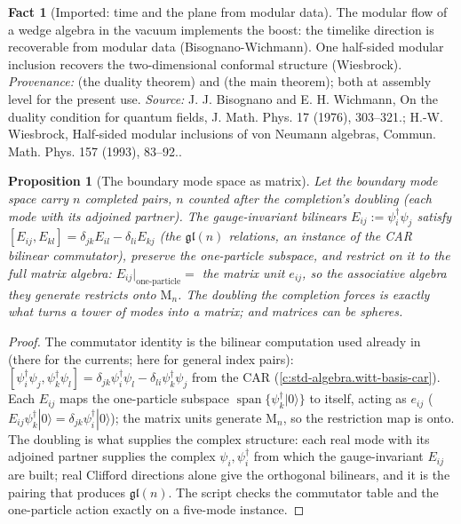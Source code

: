 \documentclass[11pt]{article}
\newtheorem{proposition}[theorem]{Proposition}
\theoremstyle{definition}
\newtheorem{fact}[theorem]{Fact}
\theoremstyle{plain}
\providecommand{\Mat}{}\renewcommand{\Mat}{\mathrm{M}}
\begin{document}
\begin{fact}[Imported: time and the plane from modular data]\label{c:scrambling.imported-time-plane-modular-data}
The modular flow of a wedge algebra in the vacuum implements the boost: the timelike direction is recoverable from modular data (Bisognano-Wichmann). One half-sided modular inclusion recovers the two-dimensional conformal structure (Wiesbrock). \emph{Provenance:} \cite{BisognanoWichmann1976} (the duality theorem) and \cite{Wiesbrock1993} (the main theorem); both at assembly level for the present use.
\emph{Source:} J. J. Bisognano and E. H. Wichmann, On the duality condition for quantum fields, J. Math. Phys. 17 (1976), 303--321.; H.-W. Wiesbrock, Half-sided modular inclusions of von Neumann algebras, Commun. Math. Phys. 157 (1993), 83--92..
\end{fact}

\begin{proposition}[The boundary mode space as matrix]\label{c:scrambling.boundary-mode-space-matrix}
Let the boundary mode space carry $n$ completed pairs, $n$ counted after the completion's doubling (each mode with its adjoined partner). The gauge-invariant bilinears $E_{ij} := \psi_i^\dagger \psi_j$ satisfy $[E_{ij}, E_{kl}] = \delta_{jk}E_{il} - \delta_{li}E_{kj}$ (the $\mathfrak{gl}(n)$ relations, an instance of the CAR bilinear commutator), preserve the one-particle subspace, and restrict on it to the full matrix algebra: $E_{ij}|_{\text{one-particle}} = $ the matrix unit $e_{ij}$, so the associative algebra they generate restricts onto $\Mat_n$. The doubling the completion forces is exactly what turns a tower of modes into a matrix; and matrices can be spheres.
\end{proposition}
\begin{proof}
The commutator identity is the bilinear computation used already in \cite[Prop.~6.1]{ButlerT7} (there for the currents; here for general index pairs): $[\psi_i^\dagger\psi_j, \psi_k^\dagger\psi_l] = \delta_{jk}\psi_i^\dagger\psi_l - \delta_{li}\psi_k^\dagger\psi_j$ from the CAR (\ref{c:std-algebra.witt-basis-car}). Each $E_{ij}$ maps the one-particle subspace $\operatorname{span}\{\psi_k^\dagger|0\rangle\}$ to itself, acting as $e_{ij}$ ($E_{ij}\psi_k^\dagger|0\rangle = \delta_{jk}\psi_i^\dagger|0\rangle$); the matrix units generate $\Mat_n$, so the restriction map is onto. The doubling is what supplies the complex structure: each real mode with its adjoined partner supplies the complex $\psi_i, \psi_i^\dagger$ from which the gauge-invariant $E_{ij}$ are built; real Clifford directions alone give the orthogonal bilinears, and it is the pairing that produces $\mathfrak{gl}(n)$. The script checks the commutator table and the one-particle action exactly on a five-mode instance.

\end{proof}
\end{document}
